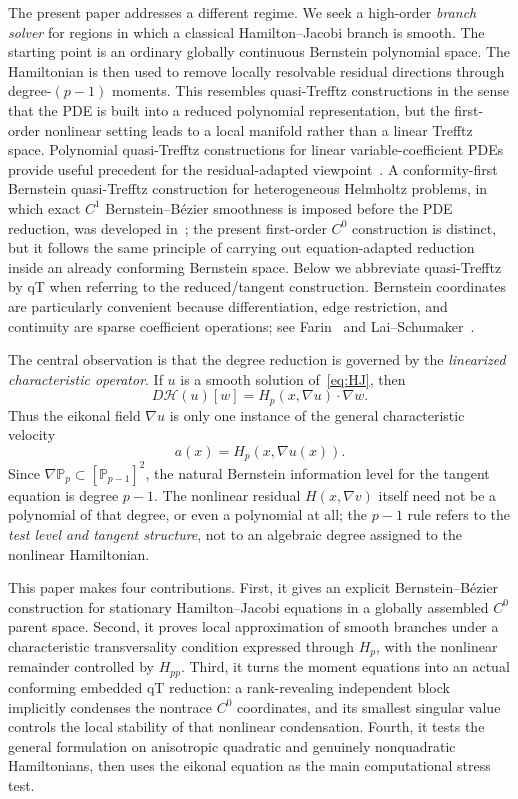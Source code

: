 \documentclass[preprint,12pt]{elsarticle}
\newcommand{\PP}{\mathbb P}
\newcommand{\grad}{\nabla}
\begin{document}
The present paper addresses a different regime.  We seek a high-order \emph{branch solver} for regions in which a classical Hamilton--Jacobi branch is smooth.  The starting point is an ordinary globally continuous Bernstein polynomial space.  The Hamiltonian is then used to remove locally resolvable residual directions through degree-$(p-1)$ moments.  This resembles quasi-Trefftz constructions in the sense that the PDE is built into a reduced polynomial representation, but the first-order nonlinear setting leads to a local manifold rather than a linear Trefftz space.  Polynomial quasi-Trefftz constructions for linear variable-coefficient PDEs provide useful precedent for the residual-adapted viewpoint~\cite{ImbertGerardDespres2014,ImbertGerardMoiolaStocker2023,ImbertGerardSylvand2025,ImbertGerardEtAl2025}.  A conformity-first Bernstein quasi-Trefftz construction for heterogeneous Helmholtz problems, in which exact $C^1$ Bernstein--B\'ezier smoothness is imposed before the PDE reduction, was developed in~\cite{KapitaC1BernsteinQT2026}; the present first-order $C^0$ construction is distinct, but it follows the same principle of carrying out equation-adapted reduction inside an already conforming Bernstein space.  Below we abbreviate quasi-Trefftz by qT when referring to the reduced/tangent construction.  Bernstein coordinates are particularly convenient because differentiation, edge restriction, and continuity are sparse coefficient operations; see Farin~\cite{Farin2002} and Lai--Schumaker~\cite{LaiSchumaker2007}.

The central observation is that the degree reduction is governed by the \emph{linearized characteristic operator}.  If $u$ is a smooth solution of~\eqref{eq:HJ}, then
\[
 D\mathcal H(u)[w]=H_p(x,\grad u)\cdot\grad w.
\]
Thus the eikonal field $\grad u$ is only one instance of the general characteristic velocity
\[
 a(x)=H_p(x,\grad u(x)).
\]
Since $\grad\PP_p\subset [\PP_{p-1}]^2$, the natural Bernstein information level for the tangent equation is degree $p-1$.  The nonlinear residual $H(x,\grad v)$ itself need not be a polynomial of that degree, or even a polynomial at all; the $p-1$ rule refers to the \emph{test level and tangent structure}, not to an algebraic degree assigned to the nonlinear Hamiltonian.

This paper makes four contributions.  First, it gives an explicit Bernstein--B\'ezier construction for stationary Hamilton--Jacobi equations in a globally assembled $C^0$ parent space.  Second, it proves local approximation of smooth branches under a characteristic transversality condition expressed through $H_p$, with the nonlinear remainder controlled by $H_{pp}$.  Third, it turns the moment equations into an actual conforming embedded qT reduction: a rank-revealing independent block implicitly condenses the nontrace $C^0$ coordinates, and its smallest singular value controls the local stability of that nonlinear condensation.  Fourth, it tests the general formulation on anisotropic quadratic and genuinely nonquadratic Hamiltonians, then uses the eikonal equation as the main computational stress test.
\end{document}
